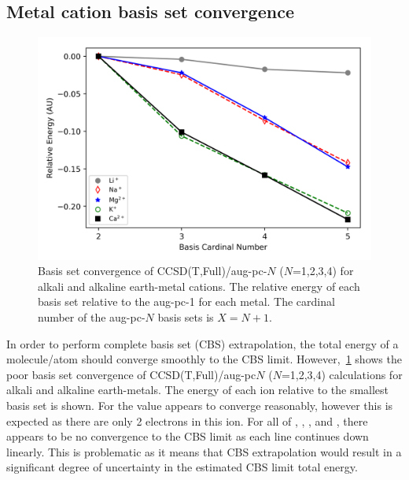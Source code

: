 \subsection{Metal cation basis set convergence}

\begin{figure}[!htbp]
  \centering
    \includegraphics[width=\textwidth]{figures/pes_metals}
    \caption[Basis set convergence for alkali and alkaline earth-metal cations.]{Basis set convergence of CCSD(T,Full)/aug-pc-$N$ ($N$=1,2,3,4) for alkali and alkaline earth-metal cations. The relative energy of each basis set relative to the aug-pc-1 for each metal. The cardinal number of the aug-pc-$N$ basis sets is $X=N+1$.}
  \label{fig:pes_metals}
\end{figure}

In order to perform complete basis set (CBS) extrapolation, the total energy of a molecule/atom should converge smoothly to the CBS limit.\cite{Truhlar1998} However,~\ref{fig:pes_metals} shows the poor basis set convergence of CCSD(T,Full)/aug-pc$N$ ($N$=1,2,3,4) calculations for alkali and alkaline earth-metals. The energy of each ion relative to the smallest basis set is shown. For  the value appears to converge reasonably, however this is expected as there are only 2 electrons in this ion. For all of , , , and , there appears to be no convergence to the CBS limit as each line continues down linearly. This is problematic as it means that CBS extrapolation would result in a significant degree of uncertainty in the estimated CBS limit total energy.

